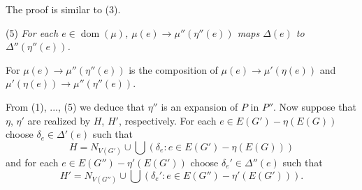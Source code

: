 The proof is similar to (3).

\hspace*{12pt}(5) \textit{For each $e \in \operatorname{dom}(\mu)$, $\mu(e) \to \mu''(\eta''(e))$ maps $\Delta(e)$ to $\Delta''(\eta''(e))$.}

For $\mu(e) \to \mu''(\eta''(e))$ is the composition of $\mu(e) \to \mu'(\eta(e))$ and $\mu'(\eta(e)) \to \mu''(\eta''(e))$.

From (1), ..., (5) we deduce that $\eta''$ is an expansion of $P$ in $P''$. Now suppose that $\eta$, $\eta'$ are realized by $H$, $H'$, respectively. For each $e \in E(G') - \eta(E(G))$ choose $\delta_e \in \Delta'(e)$ such that
\begin{equation*}
H = N_{V(G')} \cup \bigcup (\delta_e \colon e \in E(G') - \eta(E(G)))
\end{equation*}
and for each $e \in E(G'') - \eta'(E(G'))$ choose $\delta_e' \in \Delta''(e)$ such that
\begin{equation*}
H' = N_{V(G'')} \cup \bigcup (\delta_e' \colon e \in E(G'') - \eta'(E(G'))).
\end{equation*}
